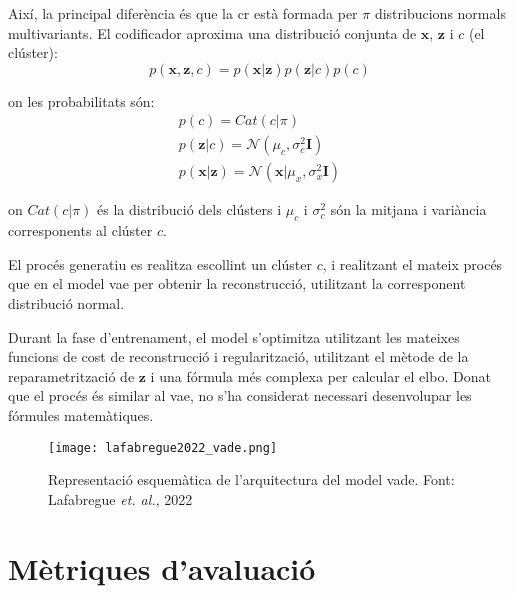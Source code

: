 \documentclass[CAT,BIB]{TFUOC}%
\begin{document}
        Així, la principal diferència és que la \gls{cr}
        està formada per $\pi$ distribucions normals multivariants.
        El codificador aproxima una distribució conjunta
        de $\mathbf{x}$, $\mathbf{z}$ i $c$ (el clúster):
        \begin{equation}
            \label{eq:vade_joint}
            p(\mathbf{x}, \mathbf{z}, c) =
            p(\mathbf{x}|\mathbf{z}) p(\mathbf{z}|c) p(c)
        \end{equation}

        on les probabilitats són:
        \begin{gather}
            \label{eq:vade_prob}
            p(c) = Cat(c|\pi)
            \\
            p(\mathbf{z}|c) = \mathcal{N} (\mu_c, \sigma^2_c \mathbf{I})
            \\
            p(\mathbf{x}|\mathbf{z}) = \mathcal{N} (\mathbf{x}|\mu_x, \sigma^2_x \mathbf{I})
        \end{gather}

        on $Cat(c|\pi)$ és la distribució dels clústers
        i $\mu_c$ i $\sigma^2_c$ són la mitjana i variància
        corresponents al clúster $c$.

        El procés generatiu es realitza
        escollint un clúster $c$,
        i realitzant el mateix procés que en el model \gls{vae}
        per obtenir la reconstrucció,
        utilitzant la corresponent distribució normal.

        Durant la fase d'entrenament,
        el model s'optimitza utilitzant les mateixes funcions de cost
        de reconstrucció i regularització,
        utilitzant el mètode de la reparametrització de $\mathbf{z}$
        i una fórmula més complexa per calcular el \gls{elbo}.
        Donat que el procés és similar al \gls{vae},
        no s'ha considerat necessari desenvolupar les fórmules matemàtiques.

        \begin{figure}
            \centering
            \texttt{[image: lafabregue2022\_vade.png]}
            \caption[Esquema model VaDE]{
                Representació esquemàtica de l'arquitectura del model \gls{vade}.
                Font: Lafabregue \textit{et. al.}, 2022 \citep{Lafabregue2022}
            }
            \label{f:vade}
        \end{figure}


    \section{Mètriques d'avaluació}
    \label{s:metrics}
\end{document}
